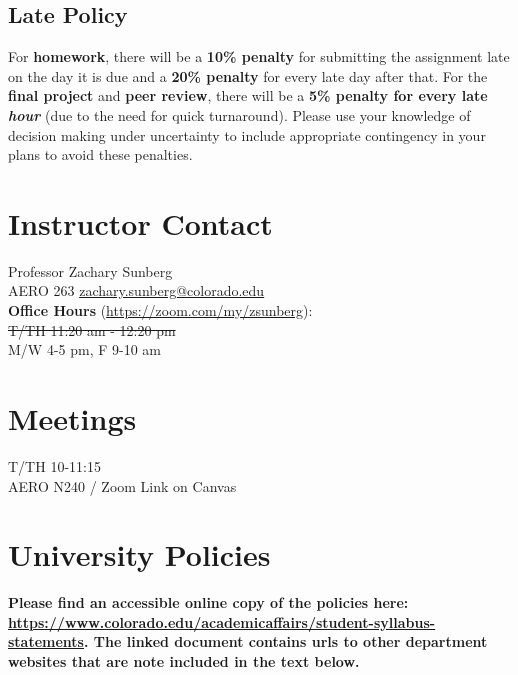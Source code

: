 \documentclass[9pt]{article}
\begin{document}
\subsection*{Late Policy}

For \textbf{homework}, there will be a \textbf{10\% penalty} for submitting the assignment late on the day it is due and a \textbf{20\% penalty} for every late day after that. For the \textbf{final project} and \textbf{peer review}, there will be a \textbf{5\% penalty for every late \emph{hour}} (due to the need for quick turnaround). Please use your knowledge of decision making under uncertainty to include appropriate contingency in your plans to avoid these penalties.

\vspace{12pt}
\begin{multicols}{2}
    \begin{minipage}{\columnwidth}
        \section*{Instructor Contact}

        Professor Zachary Sunberg\\
        AERO 263 \href{mailto://zachary.sunberg@colorado.edu}{zachary.sunberg@colorado.edu}\\
        \textbf{Office Hours} (\url{https://zoom.com/my/zsunberg}): \\
        \sout{T/TH 11:20 am - 12:20 pm}\\
        M/W 4-5 pm, F 9-10 am
    \end{minipage}

\section*{Meetings}

T/TH 10-11:15\\
AERO N240 / Zoom Link on Canvas

\end{multicols}

\section*{University Policies}

\textbf{Please find an accessible online copy of the policies here: \url{https://www.colorado.edu/academicaffairs/student-syllabus-statements}. The linked document contains urls to other department websites that are note included in the text below.}
\end{document}
